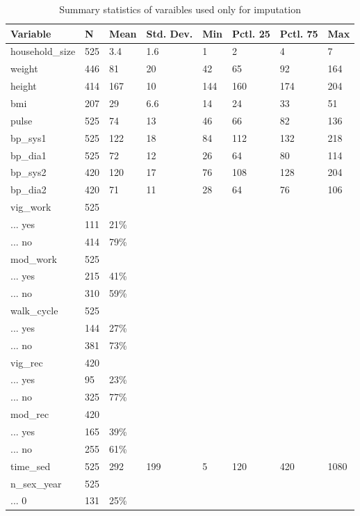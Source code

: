 \documentclass[
]{article}
\begin{document}
\begin{table}

\caption{\label{tab:imp-data-sum}Summary statistics of varaibles used only for imputation}
\centering
\begin{tabular}[t]{llllllll}
\toprule
Variable & N & Mean & Std. Dev. & Min & Pctl. 25 & Pctl. 75 & Max\\
\midrule
household\_size & 525 & 3.4 & 1.6 & 1 & 2 & 4 & 7\\
weight & 446 & 81 & 20 & 42 & 65 & 92 & 164\\
height & 414 & 167 & 10 & 144 & 160 & 174 & 204\\
bmi & 207 & 29 & 6.6 & 14 & 24 & 33 & 51\\
pulse & 525 & 74 & 13 & 46 & 66 & 82 & 136\\
\addlinespace
bp\_sys1 & 525 & 122 & 18 & 84 & 112 & 132 & 218\\
bp\_dia1 & 525 & 72 & 12 & 26 & 64 & 80 & 114\\
bp\_sys2 & 420 & 120 & 17 & 76 & 108 & 128 & 204\\
bp\_dia2 & 420 & 71 & 11 & 28 & 64 & 76 & 106\\
vig\_work & 525 &  &  &  &  &  & \\
\addlinespace
... yes & 111 & 21\% &  &  &  &  & \\
... no & 414 & 79\% &  &  &  &  & \\
mod\_work & 525 &  &  &  &  &  & \\
... yes & 215 & 41\% &  &  &  &  & \\
... no & 310 & 59\% &  &  &  &  & \\
\addlinespace
walk\_cycle & 525 &  &  &  &  &  & \\
... yes & 144 & 27\% &  &  &  &  & \\
... no & 381 & 73\% &  &  &  &  & \\
vig\_rec & 420 &  &  &  &  &  & \\
... yes & 95 & 23\% &  &  &  &  & \\
\addlinespace
... no & 325 & 77\% &  &  &  &  & \\
mod\_rec & 420 &  &  &  &  &  & \\
... yes & 165 & 39\% &  &  &  &  & \\
... no & 255 & 61\% &  &  &  &  & \\
time\_sed & 525 & 292 & 199 & 5 & 120 & 420 & 1080\\
\addlinespace
n\_sex\_year & 525 &  &  &  &  &  & \\
... 0 & 131 & 25\% &  &  &  &  & \\

\end{tabular}
\end{table}
\end{document}
